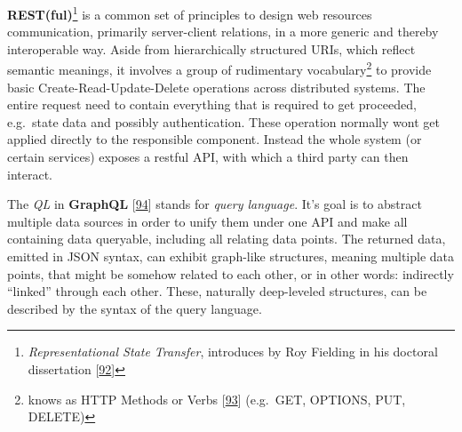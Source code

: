 \documentclass[12pt,english,a4paper,titlepage,cleardoublepage=empty,dottedtoc]{report}
\begin{document}
\textbf{REST(ful)}\footnote{\emph{Representational State Transfer},
  introduces by Roy Fielding in his doctoral dissertation
  {[}\protect\hyperlink{ref-web_spec_rest}{92}{]}} is a common set of
principles to design web resources communication, primarily
server-client relations, in a more generic and thereby interoperable
way. Aside from hierarchically structured URIs, which reflect semantic
meanings, it involves a group of rudimentary vocabulary\footnote{knows
  as HTTP Methods or Verbs
  {[}\protect\hyperlink{ref-web_spec_http-methods}{93}{]} (e.g.~GET,
  OPTIONS, PUT, DELETE)} to provide basic Create-Read-Update-Delete
operations across distributed systems. The entire request need to
contain everything that is required to get proceeded, e.g.~state data
and possibly authentication. These operation normally wont get applied
directly to the responsible component. Instead the whole system (or
certain services) exposes a restful API, with which a third party can
then interact.

The \emph{QL} in \textbf{GraphQL}
{[}\protect\hyperlink{ref-web_spec_graphql}{94}{]} stands for
\emph{query language}. It's goal is to abstract multiple data sources in
order to unify them under one API and make all containing data
queryable, including all relating data points. The returned data,
emitted in JSON syntax, can exhibit graph-like structures, meaning
multiple data points, that might be somehow related to each other, or in
other words: indirectly ``linked'' through each other. These, naturally
deep-leveled structures, can be described by the syntax of the query
language.
\end{document}

